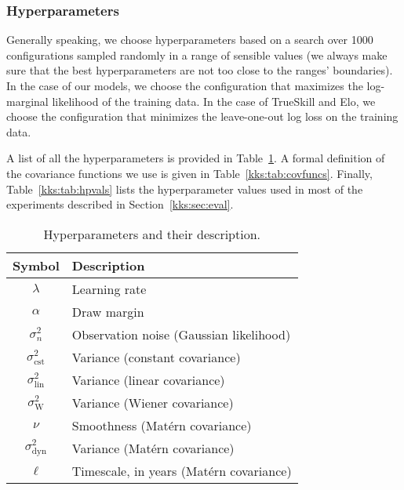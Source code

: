 \subsubsection{Hyperparameters}

Generally speaking, we choose hyperparameters based on a search over \num{1000} configurations sampled randomly in a range of sensible values (we always make sure that the best hyperparameters are not too close to the ranges' boundaries).
In the case of our models, we choose the configuration that maximizes the log-marginal likelihood of the training data.
In the case of TrueSkill and Elo, we choose the configuration that minimizes the leave-one-out log loss on the training data.

A list of all the hyperparameters is provided in Table~\ref{kks:tab:hpdefs}.
A formal definition of the covariance functions we use is given in Table~\ref{kks:tab:covfuncs}.
Finally, Table~\ref{kks:tab:hpvals} lists the hyperparameter values used in most of the experiments described in Section~\ref{kks:sec:eval}.

\begin{table}[ht]
	\caption{
		Hyperparameters and their description.}
	\label{kks:tab:hpdefs}
	\centering
	\renewcommand{\arraystretch}{1.2}
	\begin{tabular}{c l}
		\toprule
		Symbol                  & Description                             \\
		\midrule
		$\lambda$               & Learning rate                           \\
		$\alpha$                & Draw margin                             \\
		$\sigma^2_n$            & Observation noise (Gaussian likelihood) \\
		$\sigma_{\text{cst}}^2$ & Variance (constant covariance)          \\
		$\sigma_{\text{lin}}^2$ & Variance (linear covariance)            \\
		$\sigma_{\text{W}}^2$   & Variance (Wiener covariance)            \\
		$\nu$                   & Smoothness (Matérn covariance)          \\
		$\sigma_{\text{dyn}}^2$ & Variance (Matérn covariance)            \\
		$\ell$                  & Timescale, in years (Matérn covariance) \\
		\bottomrule
	\end{tabular}
\end{table}

